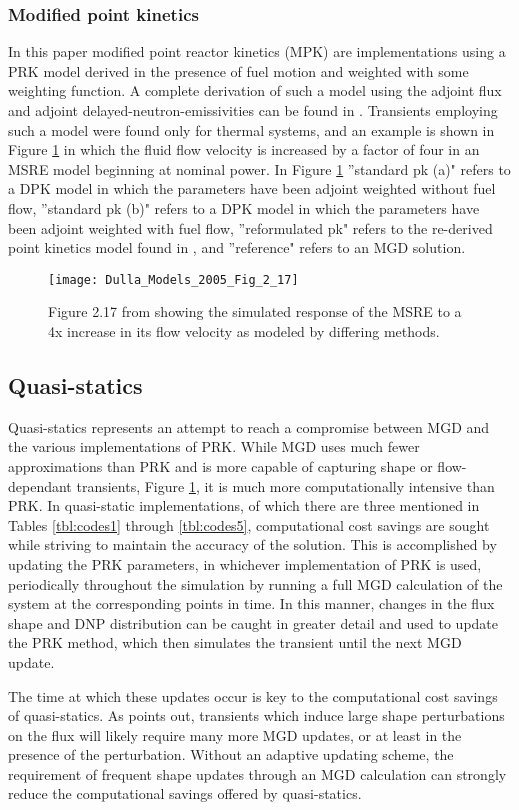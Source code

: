 \documentclass[review]{elsarticle}
\begin{document}
\subsubsection{Modified point kinetics} \label{sssec:mpk}
In this paper
modified point reactor kinetics (MPK) are implementations
using a PRK model derived in the presence of fuel motion
and weighted with some weighting function. A complete derivation of such a
model using the adjoint flux and adjoint delayed-neutron-emissivities can be
found in \cite{dulla_models_2005}. Transients employing such a model were found
only for thermal systems, and an example is shown in Figure 
\ref{fig:dulla_4x_flow} in which the fluid flow velocity is increased by a factor
of four in an MSRE model beginning at nominal power.
In Figure \ref{fig:dulla_4x_flow} ''standard pk (a)" refers
to a DPK model in which the parameters have been adjoint weighted without fuel
flow, ''standard pk (b)" refers to a DPK model in which the parameters have
been adjoint weighted with fuel flow, ''reformulated pk" refers to the re-derived
point kinetics model found in \cite{dulla_models_2005}, and ''reference" refers
to an MGD solution.

\begin{figure}[H]
   \centering
   \texttt{[image: Dulla\_Models\_2005\_Fig\_2\_17]}
   \caption{Figure 2.17 from \cite{dulla_models_2005} showing the simulated response of the MSRE
   to a 4x increase in its flow velocity as modeled by differing methods.} 
   \label{fig:dulla_4x_flow}
\end{figure}

\subsection{Quasi-statics} \label{ssec:qs}
Quasi-statics represents an attempt to
reach a compromise between MGD and the various implementations of PRK. While
MGD uses much fewer approximations than PRK and is more capable of 
capturing shape or flow-dependant transients, Figure \ref{fig:dulla_4x_flow},
it is much more computationally intensive than PRK. In quasi-static
implementations, of which there are three mentioned in Tables \ref{tbl:codes1}
through \ref{tbl:codes5},
computational cost savings are sought while striving to maintain the accuracy
of the solution. This is accomplished by updating the PRK parameters, in
whichever implementation of PRK is used, periodically throughout the simulation
by running a full MGD calculation of the system at the corresponding points
in time. In this manner, changes in the flux shape and DNP distribution can
be caught in greater detail and used to update the PRK method, which then 
simulates the transient until the next MGD update.
\par The time at which these updates occur is key to the computational
 cost savings of
quasi-statics. As \cite{dulla_models_2005} points out, transients which induce
large shape perturbations on the flux will likely require many more MGD
updates, or at least in the presence of the perturbation. Without an adaptive
updating scheme, the requirement of frequent shape updates through an MGD
calculation can strongly reduce the computational savings offered by
quasi-statics.
\end{document}
